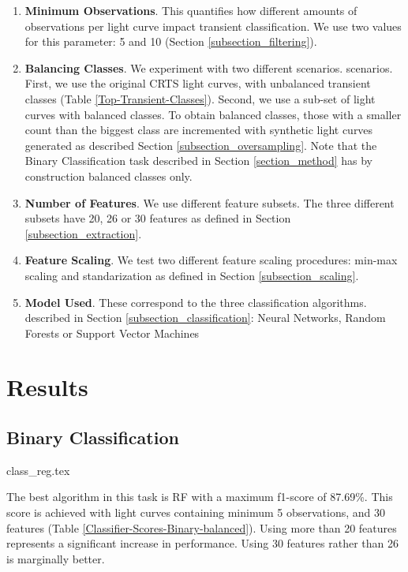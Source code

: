 \documentclass[a4paper,fleqn,usenatbib]{mnras}
\begin{document}
\begin{enumerate}
    \item \textbf{Minimum Observations}. 
      This quantifies how  different amounts of observations
      per light curve impact transient classification.
      We use two values for this parameter: 5 and 10 (Section \ref{subsection_filtering}). 
    \item \textbf{Balancing Classes}. 
      We experiment with two different scenarios.
      scenarios. 
      First, we use the original CRTS light curves, with unbalanced transient classes (Table
      \ref{Top-Transient-Classes}).
      Second, we use a sub-set of light curves with balanced classes. 
      To obtain balanced classes, those with a smaller count than the
      biggest class are incremented with synthetic light curves
      generated as  described Section \ref{subsection_oversampling}.              
      Note that the Binary Classification task described in Section
      \ref{section_method} has by construction balanced classes only.
    
    \item \textbf{Number of Features}. 
      We use different feature subsets. 
      The three different subsets have 20, 26 or 30 features as
      defined in Section \ref{subsection_extraction}. 
    \item \textbf{Feature Scaling}. 
      We test two different feature scaling procedures: min-max
      scaling and standarization as defined in Section
      \ref{subsection_scaling}. 
    \item \textbf{Model Used}. 
      These correspond to the three classification algorithms. 
      described in Section \ref{subsection_classification}:    
      Neural Networks, Random Forests or Support Vector
      Machines 
\end{enumerate}


\section{Results} 
\label{section_results}

\subsection{Binary Classification} 
\label{Results-Binary} 

{class_reg.tex} 


The best algorithm in this task is RF with a  maximum f1-score of
87.69\%.   
This score is achieved  with light curves containing minimum 5
observations, and 30 features (Table
\ref{Classifier-Scores-Binary-balanced}).
Using more than 20 features represents a significant increase in
performance.
Using 30 features rather than 26 is marginally better. 
\end{document}
